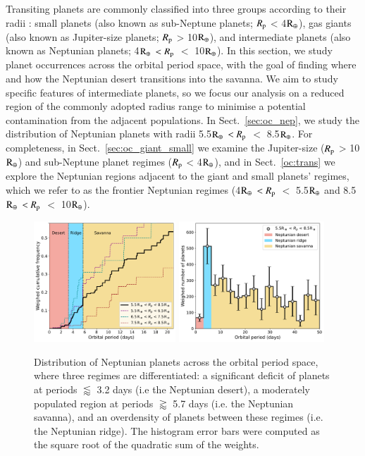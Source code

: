 \documentclass[]{aa}
\begin{document}
Transiting planets are commonly classified into three groups according to their radii \citep[e.g.][]{2012ApJS..201...15H,2019PNAS..116.9723Z}: small planets (also known as sub-Neptune planets; $R_{\rm p}$ < 4$\rm R_{\oplus}$), gas giants (also known as Jupiter-size planets; $R_{\rm p}$ > 10$\rm R_{\oplus}$), and intermediate planets (also known as Neptunian planets; 4$\rm R_{\oplus}$ $<R_{\rm p}$ $<$ 10$\rm R_{\oplus}$). In this section, we study planet occurrences across the orbital period space, with the goal of finding where and how the Neptunian desert transitions into the savanna. We aim to study specific features of intermediate planets, so we focus our analysis on a reduced region of the commonly adopted radius range to minimise a potential contamination from the adjacent populations. In Sect.~\ref{sec:oc_nep}, we study the distribution of Neptunian planets with radii 5.5$\rm R_{\oplus}$ $<R_{\rm p}$ $<$ 8.5$\rm R_{\oplus}$. For completeness, in Sect.~\ref{sec:oc_giant_small} we examine the Jupiter-size ($R_{\rm p}$ > 10$\rm R_{\oplus}$) and sub-Neptune planet regimes ($R_{\rm p}$ < 4$\rm R_{\oplus}$), and in Sect.~\ref{oc:trans} we explore the Neptunian regions adjacent to the giant and small planets' regimes, which we refer to as the frontier Neptunian regimes (4$\rm R_{\oplus}$ $<R_{\rm p}$ $<$ 5.5$\rm R_{\oplus}$ and 8.5$\rm R_{\oplus}$ $<R_{\rm p}$ $<$ 10$\rm R_{\oplus}$).

\begin{figure}
    \centering
    \includegraphics[width=0.4743\textwidth]{cumulative_nep.pdf}
    \includegraphics[width=0.486\textwidth]{oc_nep.pdf}
    \caption{Distribution of Neptunian planets across the orbital period space, where three regimes are differentiated: a significant deficit of planets at periods $\lessapprox$ 3.2 days (i.e the Neptunian desert), a moderately populated region at periods $\gtrapprox$ 5.7 days (i.e. the Neptunian savanna), and an overdensity of planets between these regimes (i.e. the Neptunian ridge). The histogram error bars were computed as the square root of the quadratic sum of the weights. }
    \label{fig:oc:nep}
\end{figure}
\end{document}
